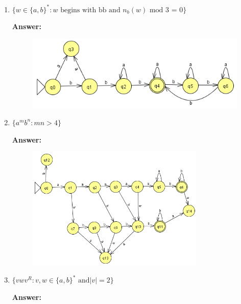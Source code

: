 \documentclass[12pt]{article}
\begin{document}
\begin{enumerate}
\begin{enumerate}
		      \item $\{w \in \{a,b \}^* : \text{$w$ begins with bb and $n_b(w)$ mod 3 = 0} \}$

		            \noindent \textbf{Answer:}

		            \begin{figure}[h!]
			            \centering
			            \includegraphics[width=0.75	\textwidth]{img/q3/q3_d.png}
		            \end{figure}

		      \item $\{a^mb^n : mn > 4\}$

		            \noindent \textbf{Answer:}

		            \begin{figure}[h!]
			            \centering
			            \includegraphics[width=0.8\textwidth]{img/q3/q3_e.png}
		            \end{figure}

		            \newpage

		      \item $\{vwv^R : v,w \in \{a,b \}^* \text{ and} |v| = 2 \}$

		            \noindent \textbf{Answer:}


\end{enumerate}
\end{enumerate}
\end{document}
